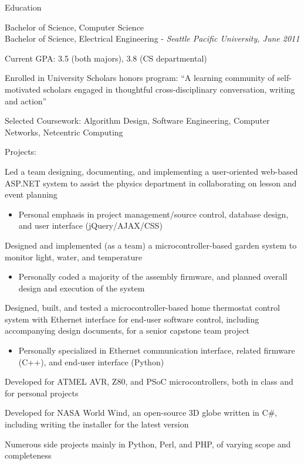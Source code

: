 \documentclass[letterpaper,10pt]{article}
\newenvironment{res_section}[1]{%
  \vskip 6pt
  \noindent
  {\Large \textbf{#1}}\\
  \rule[8pt]{\textwidth}{0.5pt}
  \vskip -8pt
}{
}
\newenvironment{res_subsection}[1]{%
  \vskip 4pt
  \noindent
  \textbf{\large{#1}}
  \begin{itemize}
}{
  \end{itemize}
}
\begin{document}
\begin{res_section}{Education}
\begin{res_subsection}{Bachelor of Science, Computer Science\\
Bachelor of Science, Electrical Engineering - \em{Seattle Pacific University, June 2011}
}
  \item Current GPA: 3.5 (both majors), 3.8 (CS departmental)
  \item Enrolled in University Scholars honors program: ``A learning community of self-motivated scholars engaged in thoughtful cross-disciplinary conversation, writing and action''
  \item Selected Coursework: Algorithm Design, Software Engineering, Computer Networks, Netcentric Computing
\end{res_subsection}
\begin{res_subsection}{Projects:}
  \item Led a team designing, documenting, and implementing a user-oriented web-based ASP.NET system  to assist the physics department in collaborating on lesson and event planning
  \begin{itemize}
    \item Personal emphasis in project management/source control, database design, and user interface (jQuery/AJAX/CSS)
  \end{itemize}
  \item Designed and implemented (as a team) a microcontroller-based garden system to monitor light, water, and temperature
  \begin{itemize}
    \item Personally coded a majority of the assembly firmware, and planned overall design and execution of the system
  \end{itemize}
  \item Designed, built, and tested a microcontroller-based home thermostat control system with Ethernet interface for end-user software control, including accompanying design documents, for a senior capstone team project
  \begin{itemize}
    \item Personally specialized in Ethernet communication interface, related firmware (C++), and end-user interface (Python)
  \end{itemize}
  \item Developed for ATMEL AVR, Z80, and PSoC microcontrollers, both in class and for personal projects
  \item Developed for NASA World Wind, an open-source 3D globe written in C\#, including writing the installer for the latest version
  \item Numerous side projects mainly in Python, Perl, and PHP, of varying scope and completeness
\end{res_subsection}
\end{res_section}
\end{document}
